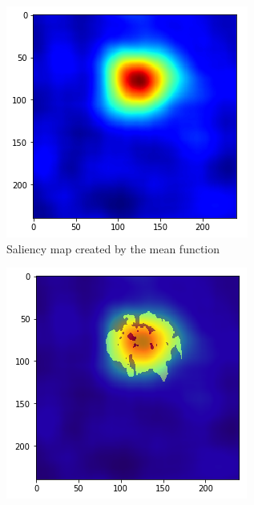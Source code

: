 \begin{figure}[H]
    \centering
    \begin{subfigure}[t]{.4\textwidth}
        \centering
        \includegraphics[width=\linewidth]{chapters/04_segmentation/images/rise_multipixel_mean_2-0.png}
        \caption{Saliency map created by the mean function}
    \end{subfigure}\hspace{1cm}%
    \begin{subfigure}[t]{.4\textwidth}
        \centering
        \includegraphics[width=\linewidth]{chapters/04_segmentation/images/rise_multipixel_mean_2-1.png}

\end{subfigure}
\end{figure}
